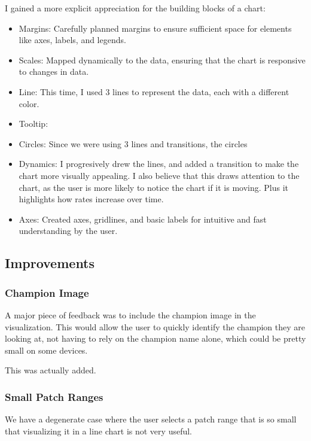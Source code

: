 \documentclass{article}
\begin{document}
I gained a more explicit appreciation for the building blocks of a chart:

\begin{itemize}
  \item Margins: Carefully planned margins to ensure sufficient space for elements like axes, labels, and legends.
  \item Scales: Mapped dynamically to the data, ensuring that the chart is responsive to changes in data.
  \item Line: This time, I used 3 lines to represent the data, each with a different color.
  \item Tooltip:
  \item Circles: Since we were using 3 lines and transitions, the circles 
  \item Dynamics: I progresively drew the lines, and added a transition to make the chart more visually appealing. 
  I also believe that this draws attention to the chart, as the user is more likely to notice the chart if it is moving.
  Plus it highlights how rates increase over time.
  \item Axes: Created axes, gridlines, and basic labels for 
  intuitive and fast understanding by the user.
\end{itemize}

\subsection{Improvements}
\label{subsec:Improvements}

\subsubsection{Champion Image}
\label{subsubsec:Champion Image}

A major piece of feedback was to include the champion image in the visualization.
This would allow the user to quickly identify the champion they are looking at,
not having to rely on the champion name alone, which could be pretty small on 
some devices.

This was actually added.

\subsubsection{Small Patch Ranges}
\label{subsubsec:Small Patch Ranges}

We have a degenerate case where the user selects a patch range that is so small
that visualizing it in a line chart is not very useful.
\end{document}
